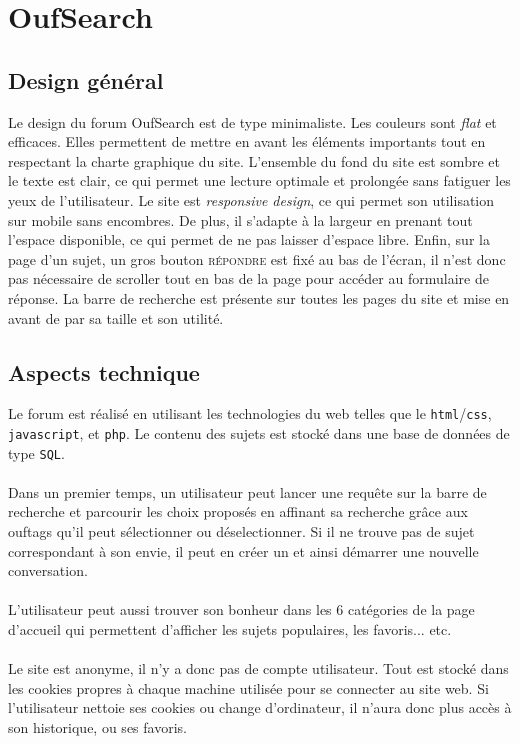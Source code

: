 \documentclass[a4paper,11pt]{article}
\begin{document}
\renewcommand{\thesection}{\arabic{section}}

\section{OufSearch}
\subsection{Design général}
Le design du forum OufSearch est de type minimaliste. Les couleurs sont \textit{flat} et efficaces. Elles permettent de mettre en avant les éléments importants tout en respectant la charte graphique du site. L'ensemble du fond du site est sombre et le texte est clair, ce qui permet une lecture optimale et prolongée sans fatiguer les yeux de l'utilisateur. Le site est \textit{responsive design}, ce qui permet son utilisation sur mobile sans encombres. De plus, il s'adapte à la largeur en prenant tout l'espace disponible, ce qui permet de ne pas laisser d'espace libre. Enfin, sur la page d'un sujet, un gros bouton \textsc{répondre} est fixé au bas de l'écran, il n'est donc pas nécessaire de scroller tout en bas de la page pour accéder au formulaire de réponse. La barre de recherche est présente sur toutes les pages du site et mise en avant de par sa taille et son utilité. 
\subsection{Aspects technique}
Le forum est réalisé en utilisant les technologies du web telles que le \texttt{html}/\texttt{css}, \texttt{javascript}, et \texttt{php}. Le contenu des sujets est stocké dans une base de données de type \texttt{SQL}.
\paragraph{} Dans un premier temps, un utilisateur peut lancer une requête sur la barre de recherche et parcourir les choix proposés en affinant sa recherche grâce aux ouftags qu'il peut sélectionner ou déselectionner. Si il ne trouve pas de sujet correspondant à son envie, il peut en créer un et ainsi démarrer une nouvelle conversation.
\paragraph{} L'utilisateur peut aussi trouver son bonheur dans les 6 catégories de la page d'accueil qui permettent d'afficher les sujets populaires, les favoris... etc.
\paragraph{} Le site est anonyme, il n'y a donc pas de compte utilisateur. Tout est stocké dans les cookies propres à chaque machine utilisée pour se connecter au site web. Si l'utilisateur nettoie ses cookies ou change d'ordinateur, il n'aura donc plus accès à son historique, ou ses favoris.
\end{document}
